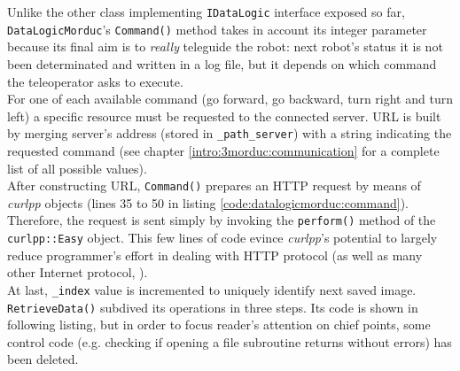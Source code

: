 Unlike the other class implementing \texttt{IDataLogic} interface
exposed so far, \texttt{DataLogicMorduc}'s \texttt{Command()} method takes
in account its integer parameter because its final aim is to
\textit{really} teleguide the robot: next robot's status it is
not been determinated and written in a log file, but it depends
on which command the teleoperator asks to execute.
\\
For one of each available command (go forward, go backward, turn right
and turn left) a specific resource must be requested to the connected
\morduc{} server. URL is built by merging server's address (stored
in \texttt{\_path\_server}) with a string indicating the requested
command (see chapter \ref{intro:3morduc:communication} for a complete
list of all possible values).
\\
After constructing URL, \texttt{Command()} prepares an HTTP
request by means of \textit{curlpp} objects (lines 35 to 50 in listing
\ref{code:datalogicmorduc:command}). Therefore, the request is sent
simply by invoking the \texttt{perform()} method of the
\texttt{curlpp::Easy} object. This few lines of code evince
\textit{curlpp}'s potential to largely reduce programmer's effort in
dealing with HTTP protocol (as well as many other Internet protocol,
\cite{library:curlpp}).
\\
At last, \texttt{\_index} value is incremented to uniquely identify
next saved image.
\\
\texttt{RetrieveData()} subdived its operations in three steps. Its
code is shown in following listing, but in order to
focus reader's attention on chief points, some control code (e.g. checking
if opening a file subroutine returns without errors) has been deleted.
\\
